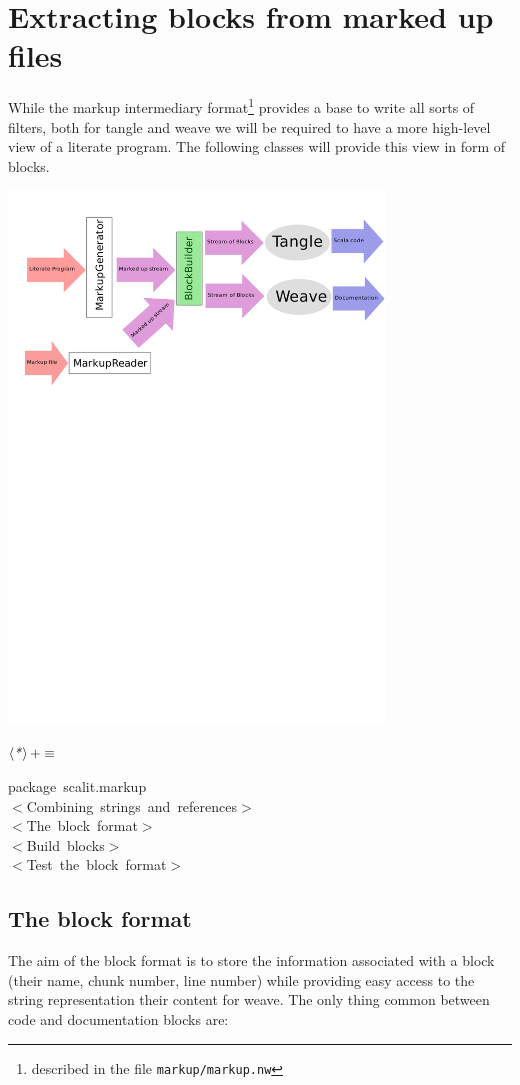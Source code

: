 \documentclass[a4paper,12pt]{article}
\begin{document}
\section{Extracting blocks from marked up files}
While the markup intermediary format\footnote{described in the file
\texttt{markup/markup.nw}} provides a base to write all sorts of filters,
both for tangle and weave we will be required to have a more high-level
view of a literate program. The following classes will provide this
view in form of blocks.

\includegraphics[width=10cm,viewport=167 590 508 800,clip]{images/blockBuilder}

$\left<\mbox{\emph{*}}\right>+\equiv$
\begin{program}{\vem package}~scalit.markup
\\[0.5em]$<$Combining~strings~and~references$>$
\\[0.5em]$<$The~block~format$>$
\\[0.5em]$<$Build~blocks$>$
\\[0.5em]$<$Test~the~block~format$>$
\\[0.5em]\end{program}
\subsection{The block format}
The aim of the block format is to store the information associated with a block
(their name, chunk number, line number) while providing easy access to the
string representation their content for weave. The only thing common between
code and documentation blocks are:
\end{document}
